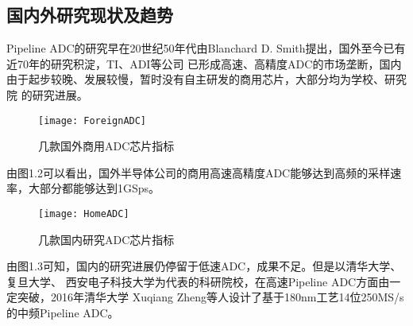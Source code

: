 \subsection{国内外研究现状及趋势}
    Pipeline ADC的研究早在20世纪50年代由Blanchard D. Smith提出，国外至今已有近70年的研究积淀，TI、ADI等公司
    已形成高速、高精度ADC的市场垄断，国内由于起步较晚、发展较慢，暂时没有自主研发的商用芯片，大部分均为学校、研究院
    的研究进展。
    \begin{figure}[ht]
        \centering
        \texttt{[image: ForeignADC]}
        \caption{\label{fig:foreignadc}几款国外商用ADC芯片指标}
    \end{figure}
    \par 由图1.2可以看出，国外半导体公司的商用高速高精度ADC能够达到高频的采样速率，大部分都能够达到1GSps。
    \begin{figure}[ht]
        \centering
        \texttt{[image: HomeADC]}
        \caption{\label{fig:homeadc}几款国内研究ADC芯片指标}
    \end{figure}
    \par 由图1.3可知，国内的研究进展仍停留于低速ADC，成果不足。但是以清华大学、复旦大学、
    西安电子科技大学为代表的科研院校，在高速Pipeline ADC方面由一定突破，2016年清华大学
    Xuqiang Zheng等人设计了基于180nm工艺14位250MS/s的中频Pipeline ADC。

